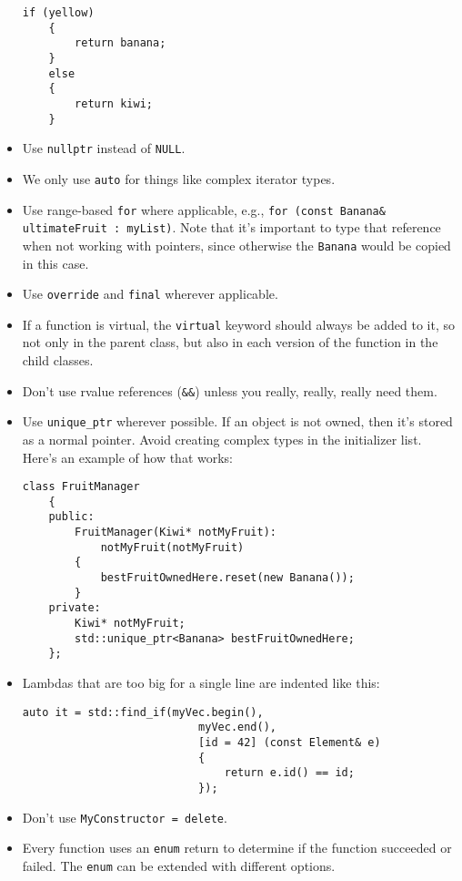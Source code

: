 \documentclass{article}
\begin{document}
\begin{itemize}
    \begin{Verbatim}[fontsize=\small]
    if (yellow)
    {
        return banana;
    }
    else
    {
        return kiwi;
    }
    \end{Verbatim}
    \item Use \texttt{nullptr} instead of \texttt{NULL}.
    \item We only use \texttt{auto} for things like complex iterator types.
    \item Use range-based \texttt{for} where applicable, e.g., \texttt{for (const Banana\& ultimateFruit : myList)}. Note that it's important to type that reference when not working with pointers, since otherwise the \texttt{Banana} would be copied in this case.
    \item Use \texttt{override} and \texttt{final} wherever applicable.
    \item If a function is virtual, the \texttt{virtual} keyword should always be added to it, so not only in the parent class, but also in each version of the function in the child classes.
    \item Don't use rvalue references (\texttt{\&\&}) unless you really, really, really need them.
    \item Use \texttt{unique\_ptr} wherever possible. If an object is not owned, then it's stored as a normal pointer. Avoid creating complex types in the initializer list. Here's an example of how that works:
    \begin{Verbatim}[fontsize=\small]
    class FruitManager
    {
    public:
        FruitManager(Kiwi* notMyFruit):
            notMyFruit(notMyFruit)
        {
            bestFruitOwnedHere.reset(new Banana());
        }
    private:
        Kiwi* notMyFruit;
        std::unique_ptr<Banana> bestFruitOwnedHere;
    };
    \end{Verbatim}
    \item Lambdas that are too big for a single line are indented like this:
    \begin{Verbatim}[fontsize=\small]
    auto it = std::find_if(myVec.begin(),
                           myVec.end(),
                           [id = 42] (const Element& e)
                           { 
                               return e.id() == id;
                           });
    \end{Verbatim}
    \item Don't use \texttt{MyConstructor = delete}.
    \item Every function uses an \texttt{enum} return to determine if the function succeeded or failed. The \texttt{enum} can be extended with different options.
\end{itemize}
\end{document}
